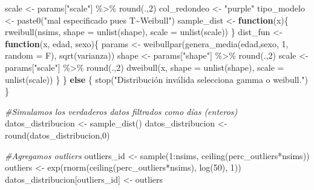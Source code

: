 \documentclass[
]{article}
\newenvironment{Shaded}{\begin{snugshade}}{\end{snugshade}}
\newcommand{\AttributeTok}[1]{\textcolor[rgb]{0.77,0.63,0.00}{#1}}
\newcommand{\CommentTok}[1]{\textcolor[rgb]{0.56,0.35,0.01}{\textit{#1}}}
\newcommand{\ControlFlowTok}[1]{\textcolor[rgb]{0.13,0.29,0.53}{\textbf{#1}}}
\newcommand{\DecValTok}[1]{\textcolor[rgb]{0.00,0.00,0.81}{#1}}
\newcommand{\FunctionTok}[1]{\textcolor[rgb]{0.00,0.00,0.00}{#1}}
\newcommand{\NormalTok}[1]{#1}
\newcommand{\OtherTok}[1]{\textcolor[rgb]{0.56,0.35,0.01}{#1}}
\newcommand{\SpecialCharTok}[1]{\textcolor[rgb]{0.00,0.00,0.00}{#1}}
\newcommand{\StringTok}[1]{\textcolor[rgb]{0.31,0.60,0.02}{#1}}
\begin{document}
\begin{Shaded}
\begin{Highlighting}[]
\NormalTok{  scale        }\OtherTok{\textless{}{-}}\NormalTok{ params[}\StringTok{"scale"}\NormalTok{]  }\SpecialCharTok{\%\textgreater{}\%} \FunctionTok{round}\NormalTok{(.,}\DecValTok{2}\NormalTok{)}
\NormalTok{  col\_redondeo }\OtherTok{\textless{}{-}} \StringTok{"purple"}
\NormalTok{  tipo\_modelo  }\OtherTok{\textless{}{-}} \FunctionTok{paste0}\NormalTok{(}\StringTok{"mal especificado pues T\textasciitilde{}Weibull"}\NormalTok{)}
\NormalTok{  sample\_dist  }\OtherTok{\textless{}{-}} \ControlFlowTok{function}\NormalTok{(x)\{}
    \FunctionTok{rweibull}\NormalTok{(nsims, }\AttributeTok{shape =} \FunctionTok{unlist}\NormalTok{(shape), }\AttributeTok{scale =}  \FunctionTok{unlist}\NormalTok{(scale))}
\NormalTok{  \}}
\NormalTok{  dist\_fun     }\OtherTok{\textless{}{-}} \ControlFlowTok{function}\NormalTok{(x, edad, sexo)\{}
\NormalTok{    params       }\OtherTok{\textless{}{-}} \FunctionTok{weibullpar}\NormalTok{(}\FunctionTok{genera\_media}\NormalTok{(edad,sexo, }\DecValTok{1}\NormalTok{, }\AttributeTok{random =}\NormalTok{ F), }\FunctionTok{sqrt}\NormalTok{(varianza))}
\NormalTok{    shape        }\OtherTok{\textless{}{-}}\NormalTok{ params[}\StringTok{"shape"}\NormalTok{] }\SpecialCharTok{\%\textgreater{}\%} \FunctionTok{round}\NormalTok{(.,}\DecValTok{2}\NormalTok{)}
\NormalTok{    scale        }\OtherTok{\textless{}{-}}\NormalTok{ params[}\StringTok{"scale"}\NormalTok{] }\SpecialCharTok{\%\textgreater{}\%} \FunctionTok{round}\NormalTok{(.,}\DecValTok{2}\NormalTok{)}
    \FunctionTok{dweibull}\NormalTok{(x, }\AttributeTok{shape =} \FunctionTok{unlist}\NormalTok{(shape), }\AttributeTok{scale =} \FunctionTok{unlist}\NormalTok{(scale))}
\NormalTok{  \}}
\NormalTok{\} }\ControlFlowTok{else}\NormalTok{ \{}
  \FunctionTok{stop}\NormalTok{(}\StringTok{"Distribución inválida selecciona \textquotesingle{}gamma\textquotesingle{} o \textquotesingle{}weibull\textquotesingle{}."}\NormalTok{)}
\NormalTok{\}}


\CommentTok{\#Simulamos los verdaderos datos filtrados como días (enteros)}
\NormalTok{datos\_distribucion }\OtherTok{\textless{}{-}} \FunctionTok{sample\_dist}\NormalTok{()}
\NormalTok{datos\_distribucion }\OtherTok{\textless{}{-}} \FunctionTok{round}\NormalTok{(datos\_distribucion,}\DecValTok{0}\NormalTok{)}

\CommentTok{\#Agregamos outliers}
\NormalTok{outliers\_id }\OtherTok{\textless{}{-}} \FunctionTok{sample}\NormalTok{(}\DecValTok{1}\SpecialCharTok{:}\NormalTok{nsims, }\FunctionTok{ceiling}\NormalTok{(perc\_outliers}\SpecialCharTok{*}\NormalTok{nsims))}
\NormalTok{outliers    }\OtherTok{\textless{}{-}} \FunctionTok{exp}\NormalTok{(}\FunctionTok{rnorm}\NormalTok{(}\FunctionTok{ceiling}\NormalTok{(perc\_outliers}\SpecialCharTok{*}\NormalTok{nsims), }\FunctionTok{log}\NormalTok{(}\DecValTok{50}\NormalTok{), }\DecValTok{1}\NormalTok{))}
\NormalTok{datos\_distribucion[outliers\_id] }\OtherTok{\textless{}{-}}\NormalTok{ outliers}


\end{Highlighting}
\end{Shaded}
\end{document}
